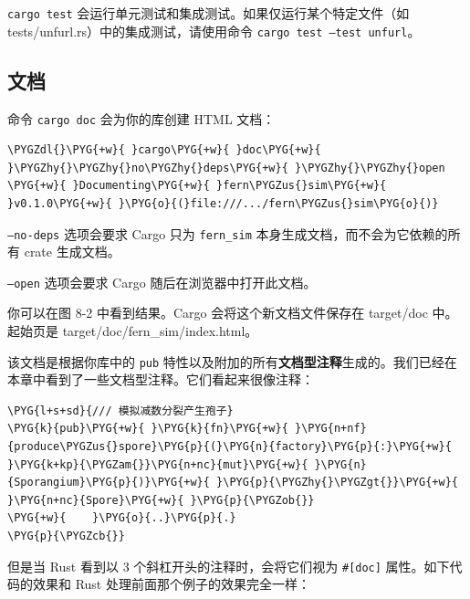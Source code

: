 \texttt{cargo test} 会运行单元测试和集成测试。如果仅运行某个特定文件（如 tests/\allowbreak{}unfurl.rs）中的集成测试，请使用命令 \texttt{cargo test --test unfurl}。

\subsection{文档}

命令 \texttt{cargo doc} 会为你的库创建 HTML 文档：

\begin{Verbatim}[commandchars=\\\{\},breaklines=true,breakanywhere=true,fontsize=\codefont,xleftmargin=17bp]
\PYGZdl{}\PYG{+w}{ }cargo\PYG{+w}{ }doc\PYG{+w}{ }\PYGZhy{}\PYGZhy{}no\PYGZhy{}deps\PYG{+w}{ }\PYGZhy{}\PYGZhy{}open
\PYG{+w}{ }Documenting\PYG{+w}{ }fern\PYGZus{}sim\PYG{+w}{ }v0.1.0\PYG{+w}{ }\PYG{o}{(}file:///.../fern\PYGZus{}sim\PYG{o}{)}
\end{Verbatim}

\texttt{--no-deps} 选项会要求 Cargo 只为 \texttt{fern\_sim} 本身生成文档，而不会为它依赖的所有 crate 生成文档。

\texttt{--open} 选项会要求 Cargo 随后在浏览器中打开此文档。

你可以在图 8-2 中看到结果。Cargo 会将这个新文档文件保存在 target/\allowbreak{}doc 中。起始页是 target/\allowbreak{}doc/\allowbreak{}fern\_sim/\allowbreak{}index.html。


该文档是根据你库中的 \texttt{pub} 特性以及附加的所有\textbf{文档型注释}生成的。我们已经在本章中看到了一些文档型注释。它们看起来很像注释：

\begin{Verbatim}[commandchars=\\\{\},breaklines=true,breakanywhere=true,fontsize=\codefont,xleftmargin=17bp]
\PYG{l+s+sd}{/// 模拟减数分裂产生孢子}
\PYG{k}{pub}\PYG{+w}{ }\PYG{k}{fn}\PYG{+w}{ }\PYG{n+nf}{produce\PYGZus{}spore}\PYG{p}{(}\PYG{n}{factory}\PYG{p}{:}\PYG{+w}{ }\PYG{k+kp}{\PYGZam{}}\PYG{n+nc}{mut}\PYG{+w}{ }\PYG{n}{Sporangium}\PYG{p}{)}\PYG{+w}{ }\PYG{p}{\PYGZhy{}\PYGZgt{}}\PYG{+w}{ }\PYG{n+nc}{Spore}\PYG{+w}{ }\PYG{p}{\PYGZob{}}
\PYG{+w}{    }\PYG{o}{..}\PYG{p}{.}
\PYG{p}{\PYGZcb{}}
\end{Verbatim}

但是当 Rust 看到以 3 个斜杠开头的注释时，会将它们视为 \texttt{\#[doc]} 属性。如下代码的效果和 Rust 处理前面那个例子的效果完全一样：

